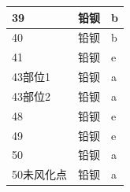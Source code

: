 \documentclass[UTF8]{ctexart}
\begin{document}
\begin{table}[H]
\begin{tabular}{|l|l|l|}
        39           & 铅钡 & b        \\ \hline
        40           & 铅钡 & b        \\ \hline
        41           & 铅钡 & e        \\ \hline
        43部位1      & 铅钡 & a        \\ \hline
        43部位2      & 铅钡 & a        \\ \hline
        48           & 铅钡 & e        \\ \hline
        49           & 铅钡 & e        \\ \hline
        50           & 铅钡 & a        \\ \hline
        50未风化点   & 铅钡 & a        \\ \hline
    \end{tabular}
\end{table}
\end{document}
